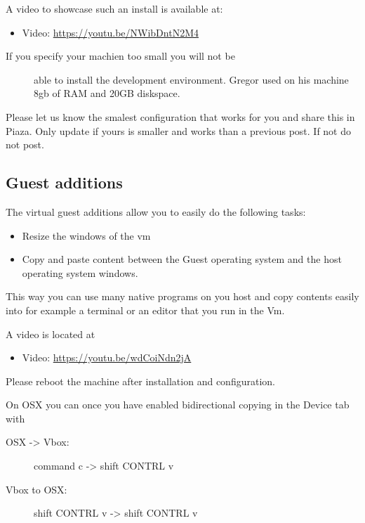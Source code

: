 A video to showcase such an install is available at:

\begin{itemize}
\tightlist
\item
  Video: \url{https://youtu.be/NWibDntN2M4}
\end{itemize}

\begin{description}
\item[If you specify your machien too small you will not be]
able to install the development environment. Gregor used on his machine
8gb of RAM and 20GB diskspace.
\end{description}

Please let us know the smalest configuration that works for you and
share this in Piaza. Only update if yours is smaller and works than a
previous post. If not do not post.

\subsection{Guest additions}\label{guest-additions}

The virtual guest additions allow you to easily do the following tasks:

\begin{itemize}
\tightlist
\item
  Resize the windows of the vm
\item
  Copy and paste content between the Guest operating system and the host
  operating system windows.
\end{itemize}

This way you can use many native programs on you host and copy contents
easily into for example a terminal or an editor that you run in the Vm.

A video is located at

\begin{itemize}
\tightlist
\item
  Video: \url{https://youtu.be/wdCoiNdn2jA}
\end{itemize}

Please reboot the machine after installation and configuration.

On OSX you can once you have enabled bidirectional copying in the Device
tab with

\begin{description}
\item[OSX -\textgreater{} Vbox:]
command c -\textgreater{} shift CONTRL v
\item[Vbox to OSX:]
shift CONTRL v -\textgreater{} shift CONTRL v
\end{description}

